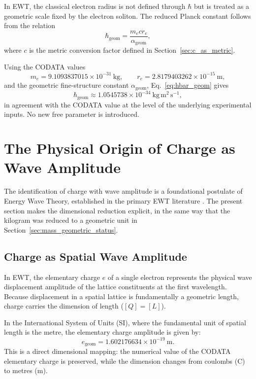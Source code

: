 \documentclass[10pt,a4paper]{article}
\begin{document}
In EWT, the classical electron radius is not defined through \(\hbar\) but is treated as a geometric scale fixed by the electron soliton. The reduced Planck constant follows from the relation
\begin{equation}
	\hbar_{\text{geom}}
	=
	\frac{m_e c r_e}{\alpha_{\text{geom}}},
	\label{eq:hbar_geom}
\end{equation}
where \(c\) is the metric conversion factor defined in Section~\ref{sec:c_as_metric}.

Using the CODATA values
\begin{equation}
	m_e = 9.1093837015 \times 10^{-31}\ \text{kg},
	\qquad
	r_e = 2.8179403262 \times 10^{-15}\ \text{m},
\end{equation}
and the geometric fine-structure constant \(\alpha_{\text{geom}}\), Eq.~\eqref{eq:hbar_geom} gives
\begin{equation}
	\hbar_{\text{geom}}
	\approx
	1.0545738 \times 10^{-34}\ \text{kg}\,\text{m}^{2}\,\text{s}^{-1},
\end{equation}
in agreement with the CODATA value at the level of the underlying experimental inputs. No new free parameter is introduced.

\section{The Physical Origin of Charge as Wave Amplitude}
\label{sec:coulomb_derived_unit}

The identification of charge with wave amplitude is a foundational
postulate of Energy Wave Theory, established in the primary EWT
literature \cite{yee2019masscharge}. The present section makes the
dimensional reduction explicit, in the same way that the kilogram was
reduced to a geometric unit in Section~\ref{sec:mass_geometric_status}.

\subsection{Charge as Spatial Wave Amplitude}
\label{sec:charge_as_amplitude}

In EWT, the elementary charge $e$ of a single electron represents the physical
wave displacement amplitude of the lattice constituents at the first wavelength.
Because displacement in a spatial lattice is fundamentally a geometric length,
charge carries the dimension of length ($[Q] = [L]$).

In the International System of Units (SI), where the fundamental unit of spatial
length is the metre, the elementary charge amplitude is given by:
\begin{equation}
	e_{\text{geom}} = 1.602176634 \times 10^{-19}\ \text{m}.
\end{equation}
This is a direct dimensional mapping: the numerical value of the CODATA elementary
charge is preserved, while the dimension changes from coulombs ($\text{C}$) to metres ($\text{m}$).
\end{document}
